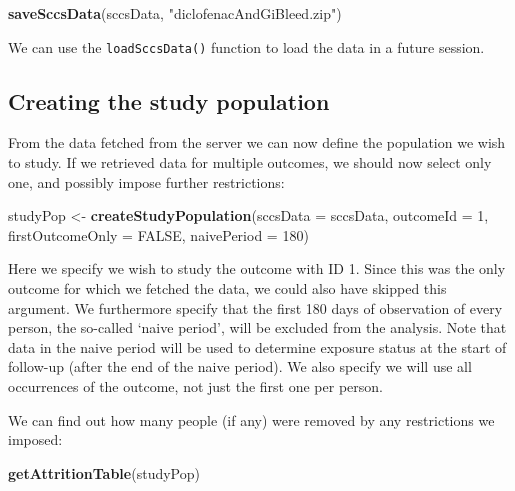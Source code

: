 \documentclass[
]{article}
\newenvironment{Shaded}{\begin{snugshade}}{\end{snugshade}}
\newcommand{\DataTypeTok}[1]{\textcolor[rgb]{0.13,0.29,0.53}{#1}}
\newcommand{\DecValTok}[1]{\textcolor[rgb]{0.00,0.00,0.81}{#1}}
\newcommand{\KeywordTok}[1]{\textcolor[rgb]{0.13,0.29,0.53}{\textbf{#1}}}
\newcommand{\NormalTok}[1]{#1}
\newcommand{\OtherTok}[1]{\textcolor[rgb]{0.56,0.35,0.01}{#1}}
\newcommand{\StringTok}[1]{\textcolor[rgb]{0.31,0.60,0.02}{#1}}
\begin{document}
\begin{Shaded}
\begin{Highlighting}[]
\KeywordTok{saveSccsData}\NormalTok{(sccsData, }\StringTok{"diclofenacAndGiBleed.zip"}\NormalTok{)}
\end{Highlighting}
\end{Shaded}

We can use the \texttt{loadSccsData()} function to load the data in a
future session.

\hypertarget{creating-the-study-population}{%
\subsection{Creating the study
population}\label{creating-the-study-population}}

From the data fetched from the server we can now define the population
we wish to study. If we retrieved data for multiple outcomes, we should
now select only one, and possibly impose further restrictions:

\begin{Shaded}
\begin{Highlighting}[]
\NormalTok{studyPop <-}\StringTok{ }\KeywordTok{createStudyPopulation}\NormalTok{(}\DataTypeTok{sccsData =}\NormalTok{ sccsData,}
                                  \DataTypeTok{outcomeId =} \DecValTok{1}\NormalTok{,}
                                  \DataTypeTok{firstOutcomeOnly =} \OtherTok{FALSE}\NormalTok{,}
                                  \DataTypeTok{naivePeriod =} \DecValTok{180}\NormalTok{)}
\end{Highlighting}
\end{Shaded}

Here we specify we wish to study the outcome with ID 1. Since this was
the only outcome for which we fetched the data, we could also have
skipped this argument. We furthermore specify that the first 180 days of
observation of every person, the so-called `naive period', will be
excluded from the analysis. Note that data in the naive period will be
used to determine exposure status at the start of follow-up (after the
end of the naive period). We also specify we will use all occurrences of
the outcome, not just the first one per person.

We can find out how many people (if any) were removed by any
restrictions we imposed:

\begin{Shaded}
\begin{Highlighting}[]
\KeywordTok{getAttritionTable}\NormalTok{(studyPop)}
\end{Highlighting}
\end{Shaded}
\end{document}
